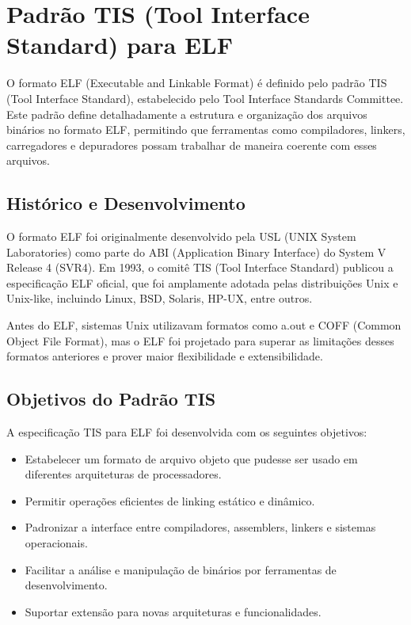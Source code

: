 \section{Padrão TIS (Tool Interface Standard) para ELF}

O formato ELF (Executable and Linkable Format) é definido pelo padrão TIS (Tool Interface Standard), estabelecido pelo Tool Interface Standards Committee. Este padrão define detalhadamente a estrutura e organização dos arquivos binários no formato ELF, permitindo que ferramentas como compiladores, linkers, carregadores e depuradores possam trabalhar de maneira coerente com esses arquivos.

\subsection{Histórico e Desenvolvimento}

O formato ELF foi originalmente desenvolvido pela USL (UNIX System Laboratories) como parte do ABI (Application Binary Interface) do System V Release 4 (SVR4). Em 1993, o comitê TIS (Tool Interface Standard) publicou a especificação ELF oficial, que foi amplamente adotada pelas distribuições Unix e Unix-like, incluindo Linux, BSD, Solaris, HP-UX, entre outros.

Antes do ELF, sistemas Unix utilizavam formatos como a.out e COFF (Common Object File Format), mas o ELF foi projetado para superar as limitações desses formatos anteriores e prover maior flexibilidade e extensibilidade.

\subsection{Objetivos do Padrão TIS}

A especificação TIS para ELF foi desenvolvida com os seguintes objetivos:

\begin{itemize}
    \item Estabelecer um formato de arquivo objeto que pudesse ser usado em diferentes arquiteturas de processadores.
    \item Permitir operações eficientes de linking estático e dinâmico.
    \item Padronizar a interface entre compiladores, assemblers, linkers e sistemas operacionais.
    \item Facilitar a análise e manipulação de binários por ferramentas de desenvolvimento.
    \item Suportar extensão para novas arquiteturas e funcionalidades.
\end{itemize}

